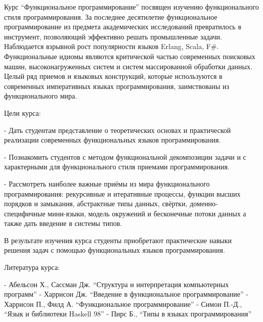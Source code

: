 
Курс ``Функциональное программирование'' посвящен изучению функционального 
стиля программирования. За последнее десятилетие функциональное 
программирование из предмета академических исследований превратилось в
инструмент, позволяющий эффективно решать промышленные задачи. Наблюдается
взрывной рост популярности языков Erlang, Scala, F#. Функциональные 
идиомы являются критической частью современных поисковых машин,
высоконагруженных систем и систем массированной обработки данных. Целый
ряд приемов и языковых конструкций, которые используются в современных
императивных языках программирования, заимствованы из функционального мира.


Цели курса:

- Дать студентам представление о теоретических основах и практической
реализации современных функциональных языков программирования.

- Познакомить студентов с методом функциональной декомпозиции задачи
и с характерными для функционального стиля приемами программирования.

- Рассмотреть наиболее важные приёмы из мира функционального программирования:
рекурсивные и итеративные процессы, функции высших порядков и замыкания,
абстрактные типы данных, свёртки, доменно-специфичные мини-языки, 
модель окружений и бесконечные потоки данных а также дать введение в
системы типов.

В результате изучения курса студенты приобретают практические навыки
решения задач с помощью функциональных языков программирования.


Литература курса:

- Абельсон Х., Сассман Дж. ``Структура и интерпретация компьютерных программ''
- Харрисон Дж. ``Введение в функциональное программирование''
- Харрисон П., Филд А. ``Функциональное программирование''
- Симон П.-Д., ``Язык и библиотеки Haskell 98''
- Пирс Б., ``Типы в языках программирования''

